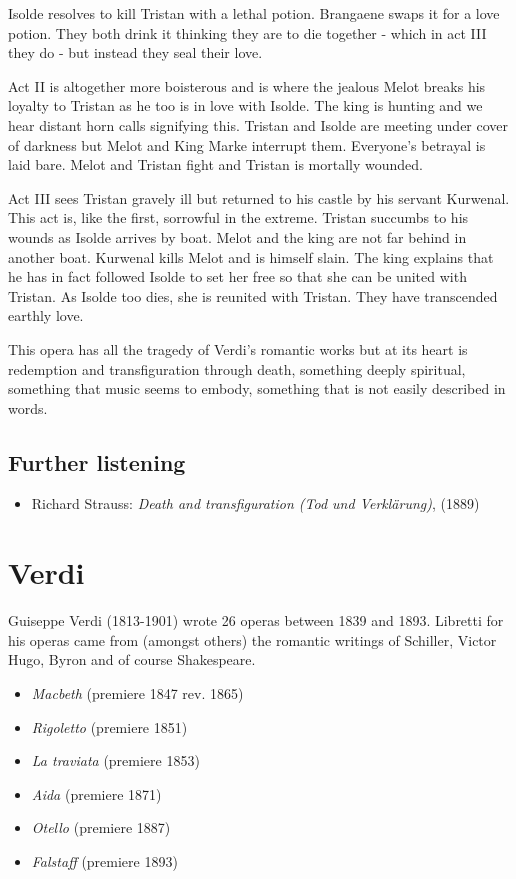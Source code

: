Isolde resolves to kill Tristan with a lethal potion. Brangaene swaps it for a love potion. They both drink it thinking they are to die together - which in act III they do - but instead they seal their love.  

Act II is altogether more boisterous and is where the jealous Melot breaks his loyalty to Tristan as he too is in love with Isolde. The king is hunting and we hear distant horn calls signifying this. Tristan and Isolde are meeting under cover of darkness but Melot and King Marke interrupt them. Everyone's betrayal is laid bare. Melot and Tristan fight and Tristan is mortally wounded. 

Act III sees Tristan gravely ill but returned to his castle by his servant Kurwenal. This act is, like the first, sorrowful in the extreme. Tristan succumbs to his wounds as Isolde arrives by boat. Melot and the king are not far behind in another boat. Kurwenal kills Melot and is himself slain. The king explains that he has in fact followed Isolde to set her free so that she can be united with Tristan. As Isolde too dies, she is reunited with Tristan. They have transcended earthly love.   

This opera has all the tragedy of Verdi's romantic works but at its heart is redemption and transfiguration through death, something deeply spiritual, something that music seems to embody, something that is not easily described in words.   

\subsection{Further listening} 
\begin{itemize}
\item Richard Strauss: \textit{Death and transfiguration (Tod und Verkl\"arung)}, (1889)
\end{itemize}

\section{Verdi}
Guiseppe Verdi (1813-1901) wrote 26 operas between 1839 and 1893. Libretti for his operas came from (amongst others) the romantic writings of Schiller, Victor Hugo, Byron and of course Shakespeare. 

\begin{itemize}
\item \textit{Macbeth} (premiere 1847 rev. 1865)
\item \textit{Rigoletto} (premiere 1851)
\item \textit{La traviata} (premiere 1853)
\item \textit{Aida} (premiere 1871)
\item \textit{Otello} (premiere 1887)
\item \textit{Falstaff} (premiere 1893)
\end{itemize}

